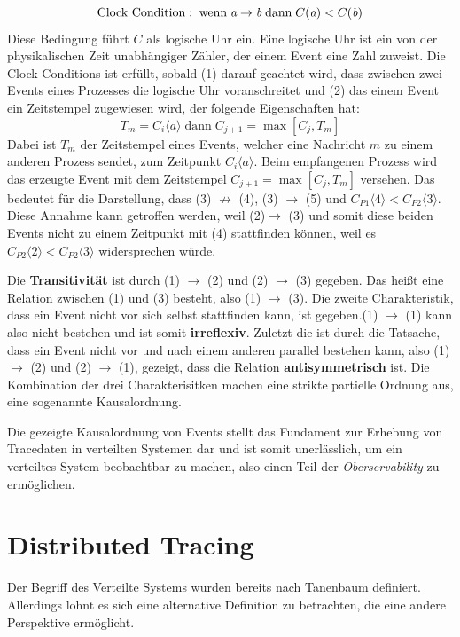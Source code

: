 \[
\text{Clock Condition}: \; \text{wenn} \; \emph{a} \rightarrow \emph{b} \; \text{dann} \; C(\emph{a})<C(\emph{b})
\]
Diese Bedingung führt $C$ als logische Uhr ein. Eine logische Uhr ist ein von der physikalischen Zeit unabhängiger Zähler, der einem Event eine Zahl zuweist. Die Clock Conditions ist erfüllt, sobald (1) darauf geachtet wird, dass zwischen zwei Events eines Prozesses die logische Uhr voranschreitet und (2) das einem Event ein Zeitstempel zugewiesen wird, der folgende Eigenschaften hat:
\[
 T_m = C_i \langle a \rangle \; 
 \text{dann} \; 
 {{C}_{j+1}} = \max[C_j,T_m]
\]
Dabei ist $T_m$ der Zeitstempel eines Events, welcher eine Nachricht $m$ zu einem anderen Prozess sendet, zum Zeitpunkt $C_i \langle a \rangle$. Beim empfangenen Prozess wird das erzeugte Event mit dem Zeitstempel ${{C}_{j+1}} = \max[C_j,T_m]$ versehen. Das bedeutet für die Darstellung, dass (3) $\not\rightarrow$ (4), (3) $\rightarrow$ (5) und $C_{P1} \langle 4 \rangle < C_{P2} \langle 3 \rangle$. Diese Annahme kann getroffen werden, weil (2)$\rightarrow$ (3) und somit diese beiden Events nicht zu einem Zeitpunkt mit (4) stattfinden können, weil es $C_{P2} \langle 2 \rangle < C_{P2} \langle 3 \rangle$ widersprechen würde.

 Die \textbf{Transitivität} ist durch (1) $\rightarrow$ (2) und (2) $\rightarrow$ (3) gegeben. Das heißt eine Relation zwischen (1) und (3) besteht, also (1) $\rightarrow$ (3). Die zweite Charakteristik, dass ein Event nicht vor sich selbst stattfinden kann, ist gegeben.(1) $\rightarrow$ (1) kann also nicht bestehen und ist somit \textbf{irreflexiv}. Zuletzt die ist durch die Tatsache, dass ein Event nicht vor und nach einem anderen parallel bestehen kann, also (1) $\rightarrow$ (2) und (2) $\rightarrow$ (1), gezeigt, dass die Relation \textbf{antisymmetrisch} ist. Die Kombination der drei Charakterisitken machen eine strikte partielle Ordnung aus, eine sogenannte Kausalordnung.

Die gezeigte Kausalordnung von Events stellt das Fundament zur Erhebung von Tracedaten in verteilten Systemen dar und ist somit unerlässlich, um ein verteiltes System beobachtbar zu machen, also einen Teil der \emph{Oberservability} zu ermöglichen.

\section{Distributed Tracing}
\label{subsection:Erkenntnisinteresse}
Der Begriff des Verteilte Systems wurden bereits nach Tanenbaum definiert. Allerdings lohnt es sich eine alternative Definition zu betrachten, die eine andere Perspektive ermöglicht. 

